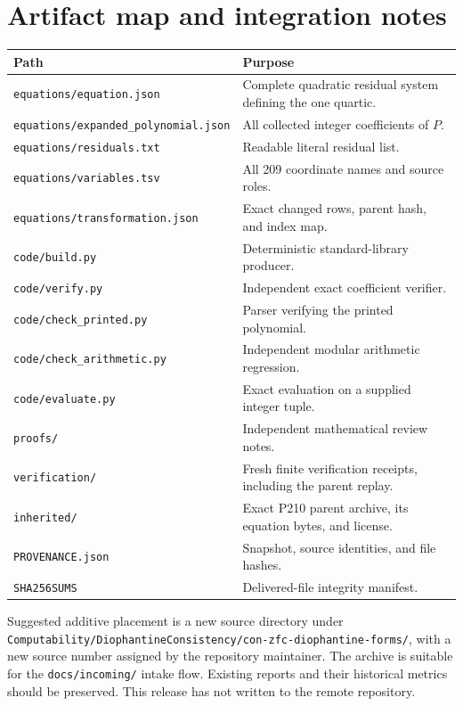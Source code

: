 \documentclass[11pt]{article}
\theoremstyle{definition}
\theoremstyle{remark}
\begin{document}
\clearpage
\section{Artifact map and integration notes}

\begin{longtable}{p{}p{}}
\toprule
Path & Purpose\\
\midrule
\endhead
\texttt{equations/equation.json} & Complete quadratic residual system defining the one quartic.\\
\nolinkurl{equations/expanded_polynomial.json} & All collected integer coefficients of $P$.\\
\texttt{equations/residuals.txt} & Readable literal residual list.\\
\texttt{equations/variables.tsv} & All 209 coordinate names and source roles.\\
\texttt{equations/transformation.json} & Exact changed rows, parent hash, and index map.\\
\texttt{code/build.py} & Deterministic standard-library producer.\\
\texttt{code/verify.py} & Independent exact coefficient verifier.\\
\texttt{code/check\_printed.py} & Parser verifying the printed polynomial.\\
\texttt{code/check\_arithmetic.py} & Independent modular arithmetic regression.\\
\texttt{code/evaluate.py} & Exact evaluation on a supplied integer tuple.\\
\texttt{proofs/} & Independent mathematical review notes.\\
\texttt{verification/} & Fresh finite verification receipts, including the parent replay.\\
\texttt{inherited/} & Exact P210 parent archive, its equation bytes, and license.\\
\texttt{PROVENANCE.json} & Snapshot, source identities, and file hashes.\\
\texttt{SHA256SUMS} & Delivered-file integrity manifest.\\
\bottomrule
\end{longtable}

Suggested additive placement is a new source directory under
\nolinkurl{Computability/DiophantineConsistency/con-zfc-diophantine-forms/},
with a new source number assigned by the repository maintainer. The archive
is suitable for the \texttt{docs/incoming/} intake flow. Existing reports
and their historical metrics should be preserved. This release has not
written to the remote repository.
\end{document}
